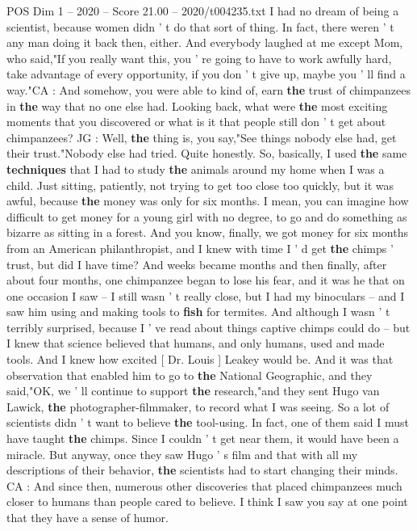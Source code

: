 \begin{textsample}{POS Dim 1 – 2020 – Score 21.00 – 2020/t004235.txt}
I had no dream of being a scientist, because women didn ' t do that sort of thing.
In fact, there weren ' t any man doing it back then, either.
And everybody laughed at me except Mom, who said,"If you really want this, you ' re going to have to work awfully hard, take advantage of every opportunity, if you don ' t give up, maybe you ' ll find a way."CA : And somehow, you were able to kind of, earn \textbf{the} trust of chimpanzees in \textbf{the} way that no one else had.
Looking back, what were \textbf{the} most exciting moments that you discovered or what is it that people still don ' t get about chimpanzees?
JG : Well, \textbf{the} thing is, you say,"See things nobody else had, get their trust."Nobody else had tried.
Quite honestly.
So, basically, I used \textbf{the} same \textbf{techniques} that I had to study \textbf{the} animals around my home when I was a child.
Just sitting, patiently, not trying to get too close too quickly, but it was awful, because \textbf{the} money was only for six months.
I mean, you can imagine how difficult to get money for a young girl with no degree, to go and do something as bizarre as sitting in a forest.
And you know, finally, we got money for six months from an American philanthropist, and I knew with time I ' d get \textbf{the} chimps ' trust, but did I have time?
And weeks became months and then finally, after about four months, one chimpanzee began to lose his fear, and it was he that on one occasion I saw -- I still wasn ' t really close, but I had my binoculars -- and I saw him using and making tools to \textbf{fish} for termites.
And although I wasn ' t terribly surprised, because I ' ve read about things captive chimps could do -- but I knew that science believed that humans, and only humans, used and made tools.
And I knew how excited [ Dr.
Louis ] Leakey would be.
And it was that observation that enabled him to go to \textbf{the} National Geographic, and they said,"OK, we ' ll continue to support \textbf{the} research,"and they sent Hugo van Lawick, \textbf{the} photographer-filmmaker, to record what I was seeing.
So a lot of scientists didn ' t want to believe \textbf{the} tool-using.
In fact, one of them said I must have taught \textbf{the} chimps.
Since I couldn ' t get near them, it would have been a miracle.
But anyway, once they saw Hugo ' s film and that with all my descriptions of their behavior, \textbf{the} scientists had to start changing their minds.
CA : And since then, numerous other discoveries that placed chimpanzees much closer to humans than people cared to believe.
I think I saw you say at one point that they have a sense of humor.

\end{textsample}
